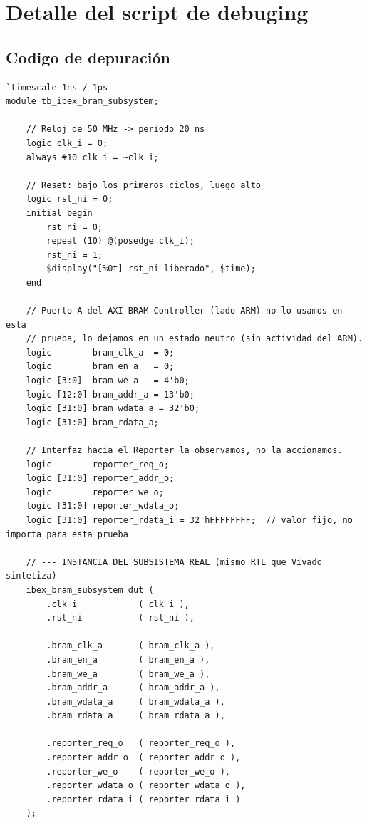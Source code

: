 \chapter{Detalle del script de debuging}
\label{ap:script-tb}

\section{Codigo de depuración}

\begin{lstlisting}[style=verilogstyle, basicstyle=\ttfamily\footnotesize, caption={Código fuente del subsistema \texttt{tb\_ibex\_bram\_subsystem.sv}}, label={code:tb_ibex_bram_subsystem.sv}]
`timescale 1ns / 1ps
module tb_ibex_bram_subsystem;

    // Reloj de 50 MHz -> periodo 20 ns
    logic clk_i = 0;
    always #10 clk_i = ~clk_i;

    // Reset: bajo los primeros ciclos, luego alto
    logic rst_ni = 0;
    initial begin
        rst_ni = 0;
        repeat (10) @(posedge clk_i);
        rst_ni = 1;
        $display("[%0t] rst_ni liberado", $time);
    end

    // Puerto A del AXI BRAM Controller (lado ARM) no lo usamos en esta
    // prueba, lo dejamos en un estado neutro (sin actividad del ARM).
    logic        bram_clk_a  = 0;
    logic        bram_en_a   = 0;
    logic [3:0]  bram_we_a   = 4'b0;
    logic [12:0] bram_addr_a = 13'b0;
    logic [31:0] bram_wdata_a = 32'b0;
    logic [31:0] bram_rdata_a;

    // Interfaz hacia el Reporter la observamos, no la accionamos.
    logic        reporter_req_o;
    logic [31:0] reporter_addr_o;
    logic        reporter_we_o;
    logic [31:0] reporter_wdata_o;
    logic [31:0] reporter_rdata_i = 32'hFFFFFFFF;  // valor fijo, no importa para esta prueba

    // --- INSTANCIA DEL SUBSISTEMA REAL (mismo RTL que Vivado sintetiza) ---
    ibex_bram_subsystem dut (
        .clk_i            ( clk_i ),
        .rst_ni           ( rst_ni ),

        .bram_clk_a       ( bram_clk_a ),
        .bram_en_a        ( bram_en_a ),
        .bram_we_a        ( bram_we_a ),
        .bram_addr_a      ( bram_addr_a ),
        .bram_wdata_a     ( bram_wdata_a ),
        .bram_rdata_a     ( bram_rdata_a ),

        .reporter_req_o   ( reporter_req_o ),
        .reporter_addr_o  ( reporter_addr_o ),
        .reporter_we_o    ( reporter_we_o ),
        .reporter_wdata_o ( reporter_wdata_o ),
        .reporter_rdata_i ( reporter_rdata_i )
    );


\end{lstlisting}
